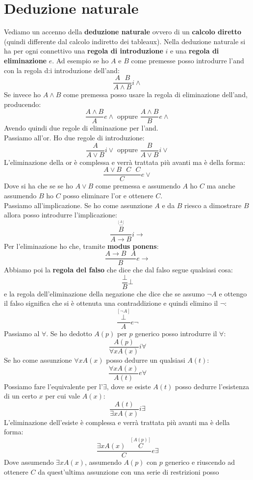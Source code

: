 \documentclass[a4paper,12pt, oneside]{book}
\begin{document}
\section{Deduzione naturale}
Vediamo un accenno della \textbf{deduzione naturale} ovvero di un
\textbf{calcolo diretto} (quindi differente dal calcolo indiretto dei
tableaux). Nella deduzione naturale si ha per ogni connettivo una \textbf{regola
di introduzione} $i$ e una \textbf{regola di eliminazione} $e$. Ad esempio se ho
$A$ e $B$ come premesse posso introdurre l'and con la regola d:i introduzione
dell'and: 
\[\frac{A\,\,\,\,B}{A\land B}i\land\]
Se invece ho $A\land B$ come premessa posso usare la regola di eliminazione
dell'and, producendo:
\[\frac{A\land B}{A}e\land\mbox{ oppure }\frac{A\land B}{B}e\land\]
Avendo quindi due regole di eliminazione per l'and.\\
Passiamo all'or. Ho due regole di introduzione:
\[\frac{A}{A\lor B}i\lor\mbox{ oppure }\frac{B}{A\lor B}i\lor\]
L'eliminazione della or è complessa e verrà trattata più avanti ma è della
forma:
\[\frac{A\lor B\,\,\,\,C\,\,\,\,C}{C}e\lor\]
Dove si ha che se se ho $A\lor B$ come premessa e assumendo $A$ ho $C$ ma anche
assumendo $B$ ho $C$ posso eliminare l'or e ottenere $C$.\\
Passiamo all'implicazione. Se ho come assunzione $A$ e da $B$ riesco a
dimostrare $B$ allora posso introdurre l'implicazione:
\[\frac{\stackrel{\stackrel{[A]}{\cdots}}{B}}{A\to B}i\to\]
Per l'eliminazione ho che, tramite \textbf{modus ponens}:
\[\frac{A\to B\,\,\,\,A}{B}e\to\]
Abbiamo poi la \textbf{regola del falso} che dice che dal falso segue qualsiasi
cosa: 
\[\frac{\bot}{B}\bot\]
e la regola dell'eliminazione della negazione che dice che se assumo $\neg A$ e
ottengo il falso significa che si è ottenuta una contraddizione e quindi elimino
il $\neg$:
\[\frac{\stackrel{[\neg A]}{\bot}}{A}e\neg\]
Passiamo al $\forall$. Se ho dedotto $A(p)$ per $p$ generico posso introdurre il
$\forall$:
\[\frac{A(p)}{\forall xA(x)}i\forall\]
Se ho come assunzione $\forall xA(x)$ posso dedurre un qualsiasi $A(t)$:
\[\frac{\forall xA(x)}{A(t)}e\forall\]
Possiamo fare l'equivalente per l'$\exists$, dove se esiste $A(t)$ posso dedurre
l'esistenza di un certo $x$ per cui vale $A(x)$:
\[\frac{A(t)}{\exists xA(x)}i\exists\]
L'eliminazione dell'esiste è complessa e verrà trattata più avanti ma è della
forma:
\[\frac{\exists xA(x)\,\,\,\,\stackrel{[A(p)]}{C}}{C}e\exists\]
Dove assumendo $\exists xA(x)$, assumendo $A(p)$ con $p$ generico e riuscendo ad
ottenere $C$ da quest'ultima assunzione con una serie di restrizioni posso
\end{document}
